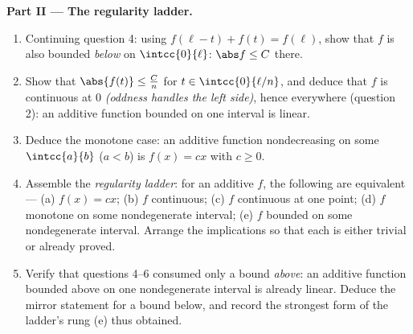 \begin{problem}[{Weekend problem --- $f(x + y) = f(x) + f(y)$:
regularity forces linearity, and the portrait of the monsters}]
\medskip
\noindent\textbf{Part II --- The regularity ladder.}
\begin{enumerate}[resume]
  \item Continuing question 4: using $f(\ell - t) + f(t) =
        f(\ell)$, show that $f$ is also bounded \emph{below} on
        $\intcc{0}{\ell}$: $\abs f \leq C$ there.
  \item Show that $\abs{f(t)} \leq \frac{C}{n}$ for $t \in
        \intcc{0}{\ell/n}$, and deduce that $f$ is continuous at
        $0$ \emph{(oddness handles the left side)}, hence
        everywhere (question 2): an additive function bounded on
        one interval is linear.
  \item Deduce the monotone case: an additive function
        nondecreasing on some $\intcc{a}{b}$ ($a < b$) is $f(x)
        = cx$ with $c \geq 0$.
  \item Assemble the \emph{regularity ladder}: for an additive
        $f$, the following are equivalent --- (a) $f(x) = cx$;
        (b) $f$ continuous; (c) $f$ continuous at one point; (d)
        $f$ monotone on some nondegenerate interval; (e) $f$
        bounded on some nondegenerate interval. Arrange the
        implications so that each is either trivial or already
        proved.
  \item Verify that questions 4--6 consumed only a bound
        \emph{above}: an additive function bounded above on one
        nondegenerate interval is already linear. Deduce the
        mirror statement for a bound below, and record the
        strongest form of the ladder's rung (e) thus obtained.
\end{enumerate}


\end{problem}
